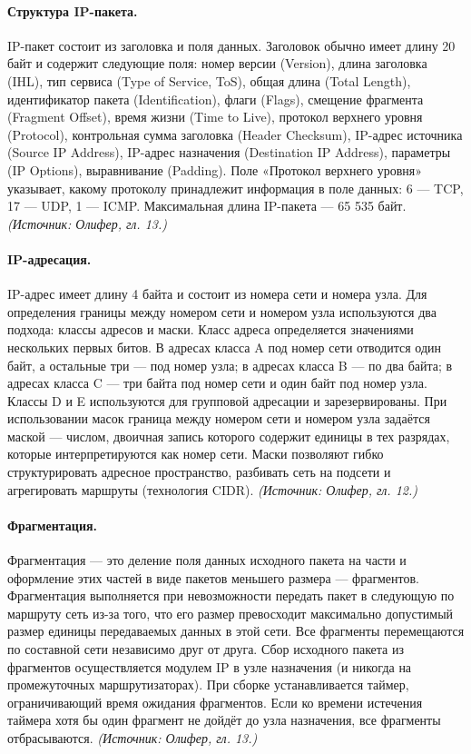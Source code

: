 \documentclass[a4paper,12pt]{article}
\begin{document}
\paragraph{Структура IP-пакета.}
IP-пакет состоит из заголовка и поля данных. Заголовок обычно имеет длину 20 байт и содержит следующие поля: номер версии (Version), длина заголовка (IHL), тип сервиса (Type of Service, ToS), общая длина (Total Length), идентификатор пакета (Identification), флаги (Flags), смещение фрагмента (Fragment Offset), время жизни (Time to Live), протокол верхнего уровня (Protocol), контрольная сумма заголовка (Header Checksum), IP-адрес источника (Source IP Address), IP-адрес назначения (Destination IP Address), параметры (IP Options), выравнивание (Padding). Поле «Протокол верхнего уровня» указывает, какому протоколу принадлежит информация в поле данных: 6 — TCP, 17 — UDP, 1 — ICMP. Максимальная длина IP-пакета — 65 535 байт.
\textit{(Источник: Олифер, гл. 13.)}

\paragraph{IP-адресация.}
IP-адрес имеет длину 4 байта и состоит из номера сети и номера узла. Для определения границы между номером сети и номером узла используются два подхода: классы адресов и маски. Класс адреса определяется значениями нескольких первых битов. В адресах класса A под номер сети отводится один байт, а остальные три — под номер узла; в адресах класса B — по два байта; в адресах класса C — три байта под номер сети и один байт под номер узла. Классы D и E используются для групповой адресации и зарезервированы. При использовании масок граница между номером сети и номером узла задаётся маской — числом, двоичная запись которого содержит единицы в тех разрядах, которые интерпретируются как номер сети. Маски позволяют гибко структурировать адресное пространство, разбивать сеть на подсети и агрегировать маршруты (технология CIDR).
\textit{(Источник: Олифер, гл. 12.)}

\paragraph{Фрагментация.}
Фрагментация — это деление поля данных исходного пакета на части и оформление этих частей в виде пакетов меньшего размера — фрагментов. Фрагментация выполняется при невозможности передать пакет в следующую по маршруту сеть из-за того, что его размер превосходит максимально допустимый размер единицы передаваемых данных в этой сети. Все фрагменты перемещаются по составной сети независимо друг от друга. Сбор исходного пакета из фрагментов осуществляется модулем IP в узле назначения (и никогда на промежуточных маршрутизаторах). При сборке устанавливается таймер, ограничивающий время ожидания фрагментов. Если ко времени истечения таймера хотя бы один фрагмент не дойдёт до узла назначения, все фрагменты отбрасываются.
\textit{(Источник: Олифер, гл. 13.)}
\end{document}
